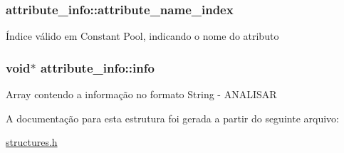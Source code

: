 \subsubsection[{\texorpdfstring{attribute\+\_\+name\+\_\+index}{attribute_name_index}}]{ attribute\+\_\+info\+::attribute\+\_\+name\+\_\+index}\hypertarget{structattribute__info_a19df9d4b42eb55ca5dc1bed98df89378}{}\label{structattribute__info_a19df9d4b42eb55ca5dc1bed98df89378}
Índice válido em Constant Pool, indicando o nome do atributo 
\subsubsection[{\texorpdfstring{info}{info}}]{\setlength{\rightskip}{0pt plus 5cm}void$\ast$ attribute\+\_\+info\+::info}\hypertarget{structattribute__info_a7f168925308e418b7b44c9f11fdf42ae}{}\label{structattribute__info_a7f168925308e418b7b44c9f11fdf42ae}
Array contendo a informação no formato String -\/ A\+N\+A\+L\+I\+S\+AR 

A documentação para esta estrutura foi gerada a partir do seguinte arquivo\+:\begin{DoxyCompactItemize}
\item 
\hyperlink{structures_8h}{structures.\+h}\end{DoxyCompactItemize}

